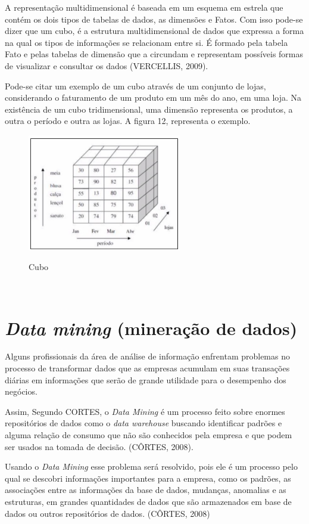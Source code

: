 A representação multidimensional é baseada em um esquema em estrela que contém os dois tipos de tabelas de dados, as dimensões e Fatos.
Com isso pode-se dizer que um cubo, é a estrutura multidimensional de dados que expressa a forma na qual os tipos de informações se relacionam entre si. É formado pela tabela Fato e pelas tabelas de dimensão que a circundam e representam possíveis formas de visualizar e consultar os dados (VERCELLIS, 2009).

Pode-se citar um exemplo de um cubo através de um conjunto de lojas, considerando o faturamento de um produto em um mês do ano, em uma loja. Na existência de um cubo tridimensional, uma dimensão representa os produtos, a outra o período e outra as lojas. A figura 12,  representa o exemplo.

\begin{figure}[H]
	\vspace*{0,2cm}
    \centering
    \caption{Cubo}
    \includegraphics[width=0.6\textwidth]{./04-figuras/figura-12}
    \label{fig:ilustfig12}
\end{figure}
\vspace*{-0,9cm}
{\raggedright {}} \\

\section{\textit{Data mining} (minera\c{c}\~{a}o de dados)}

Alguns profissionais da área de análise de informação enfrentam problemas no processo de transformar dados que as empresas acumulam em suas transações diárias em informações que serão de grande utilidade para o desempenho dos negócios. 

Assim, Segundo CORTES, o \textit{Data Mining} é um processo feito sobre enormes repositórios de dados como o \textit{data warehouse} buscando identificar padrões e alguma relação de consumo que não são conhecidos pela empresa e que podem ser usados na tomada de decisão. (CÔRTES, 2008).

Usando o \textit{Data Mining} esse problema será resolvido, pois ele é um processo pelo qual se descobri informações importantes para a empresa, como os padrões, as associações entre as informações da base de dados, mudanças, anomalias e as estruturas, em grandes quantidades de dados que são armazenados em base de dados ou outros repositórios de dados. (CÔRTES, 2008)
